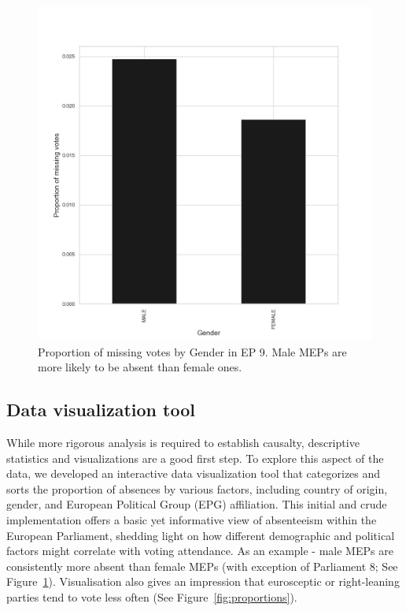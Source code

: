 \documentclass{article}
\begin{document}
    \begin{figure}[htb]
        \centering
        \includegraphics[width=\textwidth]{Graphs/genderreport.png}
        \caption
        {Proportion of missing votes by Gender in EP 9. Male MEPs are more likely to be absent than female ones.}
        \label{fig:gender}
    \end{figure}

    \subsection{Data visualization tool}
    While more rigorous analysis is required to establish causalty, descriptive statistics and visualizations are a
    good first step. To explore this aspect of the data, we developed an interactive data visualization
    tool that categorizes and sorts the proportion of absences by various factors, including country of origin, gender,
    and European Political Group (EPG) affiliation. This initial and crude implementation offers a basic yet
    informative view of
    absenteeism within the European Parliament, shedding light on how different demographic and political factors might
    correlate with voting attendance. As an example - male MEPs are consistently more absent than female MEPs (with
    exception of Parliament 8; See Figure~\ref{fig:gender}). Visualisation also gives an impression that eurosceptic
    or right-leaning parties tend to vote less often (See Figure~\ref{fig:proportions}).
\end{document}
